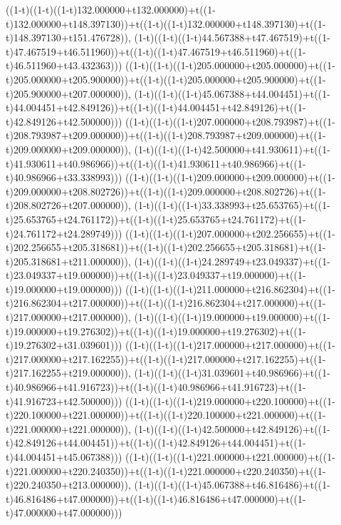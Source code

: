 ((1-t)((1-t)((1-t)132.000000+t132.000000)+t((1-t)132.000000+t148.397130))+t((1-t)((1-t)132.000000+t148.397130)+t((1-t)148.397130+t151.476728)),                                     (1-t)((1-t)((1-t)44.567388+t47.467519)+t((1-t)47.467519+t46.511960))+t((1-t)((1-t)47.467519+t46.511960)+t((1-t)46.511960+t43.432363)))
((1-t)((1-t)((1-t)205.000000+t205.000000)+t((1-t)205.000000+t205.900000))+t((1-t)((1-t)205.000000+t205.900000)+t((1-t)205.900000+t207.000000)),                                     (1-t)((1-t)((1-t)45.067388+t44.004451)+t((1-t)44.004451+t42.849126))+t((1-t)((1-t)44.004451+t42.849126)+t((1-t)42.849126+t42.500000)))
((1-t)((1-t)((1-t)207.000000+t208.793987)+t((1-t)208.793987+t209.000000))+t((1-t)((1-t)208.793987+t209.000000)+t((1-t)209.000000+t209.000000)),                                     (1-t)((1-t)((1-t)42.500000+t41.930611)+t((1-t)41.930611+t40.986966))+t((1-t)((1-t)41.930611+t40.986966)+t((1-t)40.986966+t33.338993)))
((1-t)((1-t)((1-t)209.000000+t209.000000)+t((1-t)209.000000+t208.802726))+t((1-t)((1-t)209.000000+t208.802726)+t((1-t)208.802726+t207.000000)),                                     (1-t)((1-t)((1-t)33.338993+t25.653765)+t((1-t)25.653765+t24.761172))+t((1-t)((1-t)25.653765+t24.761172)+t((1-t)24.761172+t24.289749)))
((1-t)((1-t)((1-t)207.000000+t202.256655)+t((1-t)202.256655+t205.318681))+t((1-t)((1-t)202.256655+t205.318681)+t((1-t)205.318681+t211.000000)),                                     (1-t)((1-t)((1-t)24.289749+t23.049337)+t((1-t)23.049337+t19.000000))+t((1-t)((1-t)23.049337+t19.000000)+t((1-t)19.000000+t19.000000)))
((1-t)((1-t)((1-t)211.000000+t216.862304)+t((1-t)216.862304+t217.000000))+t((1-t)((1-t)216.862304+t217.000000)+t((1-t)217.000000+t217.000000)),                                     (1-t)((1-t)((1-t)19.000000+t19.000000)+t((1-t)19.000000+t19.276302))+t((1-t)((1-t)19.000000+t19.276302)+t((1-t)19.276302+t31.039601)))
((1-t)((1-t)((1-t)217.000000+t217.000000)+t((1-t)217.000000+t217.162255))+t((1-t)((1-t)217.000000+t217.162255)+t((1-t)217.162255+t219.000000)),                                     (1-t)((1-t)((1-t)31.039601+t40.986966)+t((1-t)40.986966+t41.916723))+t((1-t)((1-t)40.986966+t41.916723)+t((1-t)41.916723+t42.500000)))
((1-t)((1-t)((1-t)219.000000+t220.100000)+t((1-t)220.100000+t221.000000))+t((1-t)((1-t)220.100000+t221.000000)+t((1-t)221.000000+t221.000000)),                                     (1-t)((1-t)((1-t)42.500000+t42.849126)+t((1-t)42.849126+t44.004451))+t((1-t)((1-t)42.849126+t44.004451)+t((1-t)44.004451+t45.067388)))
((1-t)((1-t)((1-t)221.000000+t221.000000)+t((1-t)221.000000+t220.240350))+t((1-t)((1-t)221.000000+t220.240350)+t((1-t)220.240350+t213.000000)),                                     (1-t)((1-t)((1-t)45.067388+t46.816486)+t((1-t)46.816486+t47.000000))+t((1-t)((1-t)46.816486+t47.000000)+t((1-t)47.000000+t47.000000)))
